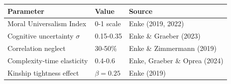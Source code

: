 \begin{tcolorbox}[colback=yellow!10!white, colframe=orange!75!black, title=Quick Reference: Key Enke Parameters]
\begin{tabular}{lll}
\textbf{Parameter} & \textbf{Value} & \textbf{Source} \\
\hline
Moral Universalism Index & 0-1 scale & Enke (2019, 2022) \\
Cognitive uncertainty $\sigma$ & 0.15-0.35 & Enke \& Graeber (2023) \\
Correlation neglect & 30-50\% & Enke \& Zimmermann (2019) \\
Complexity-time elasticity & 0.4-0.6 & Enke, Graeber \& Oprea (2024) \\
Kinship tightness effect & $\beta = 0.25$ & Enke (2019) \\
\end{tabular}
\end{tcolorbox}


